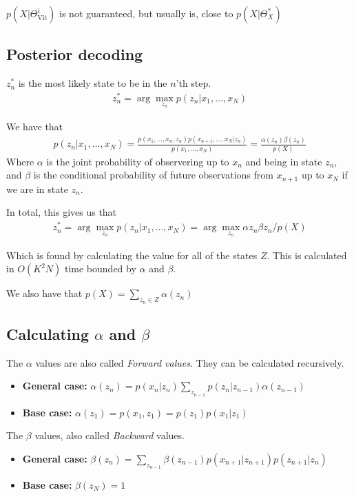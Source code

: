 \documentclass{article}
\begin{document}
  $p(X | \Theta_{\text{Vit}}^i)$ is not guaranteed, but usually is, close to $p(X | \Theta^*_X)$




  \subsection{Posterior decoding} 
  $z^*_n$ is the most likely state to be in the $n$'th step. 
  \begin{align}
    z^*_n = \arg \max_{z_n} p(z_n | x_1, \dots, x_N)
  \end{align}

  We have that
   \begin{align}
    p(z_n | x_1, \dots, x_N)  = \frac{p(x_1, \dots, x_n, z_n) p(x_{n+1}, \dots, x_N | z_n)}{p(x_1, \dots, x_N)}  = \frac{\alpha(z_n) \beta(z_n)}{p(X)}
  \end{align}
  Where $\alpha$ is the joint probability of observering up to $x_n$ and being in state $z_n$, and $\beta$ is the conditional probability of future observations from $x_{n+1}$ up to $x_N$ if we are in state $z_n$. 

  In total, this gives us that
  \begin{align}
    z^*_n = \arg \max_{z_n} p (z_n | x_1, \dots, x_N) = \arg \max_{z_n} \alpha{z_n}\beta{z_n}/p(X)
  \end{align}
  
  Which is found by calculating the value for all of the states $Z$. This is calculated in $O(K^2N)$ time bounded by $\alpha$ and $\beta$.

  We also have that $p(X) = \sum_{z_n \in Z}{\alpha(z_n)}$

\subsection{Calculating $\alpha$ and $\beta$}
  The $\alpha$ values are also called \emph{Forward values}.
  They can be calculated recursively.
  \begin{itemize}
    \item \textbf{General case:} $\alpha(z_n) = p(x_n | z_n) \sum_{z_{n-1}}p(z_n | z_{n-1})\alpha(z_{n-1})$
    \item \textbf{Base case:} $\alpha(z_1) = p(x_1, z_1) = p(z_1)p(x_1|z_1)$
  \end{itemize}
  
  The $\beta$ values, also called \emph{Backward} values.
  \begin{itemize}
    \item \textbf{General case:} $\beta(z_n) = \sum_{z_{n-1}}\beta(z_{n-1})p(x_{n+1}|z_{n+1})p(z_{n+1}|z_n)$
    \item \textbf{Base case:} $\beta(z_N) = 1$
  \end{itemize}
  
\end{document}
